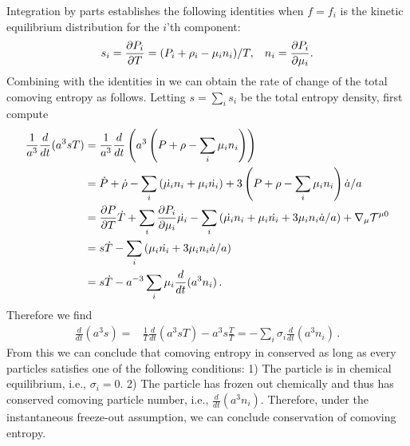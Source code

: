 Integration by parts establishes the following identities when $f=f_i$ is the kinetic equilibrium distribution  for the $i$'th component:
\begin{equation}\label{identities}
s_i=\frac{\partial P_i}{\partial T}=(P_i+\rho_i-\mu_i n_i)/T, \hspace{3mm} n_i=\frac{\partial P_i}{\partial \mu_i}.
\end{equation}
Combining  with the identities in  we can obtain the rate of change of the total comoving entropy as follows.  Letting $s=\sum_i s_i$ be the total entropy density, first compute
\begin{align}\frac{1}{a^3}\frac{d}{dt}(a^3sT)&=\frac{1}{a^{3}}\frac{d}{dt}\left(a^3\left(P+\rho-\sum_i \mu_i n_i\right)\right)\\
&=\dot{P}+\dot{\rho}-\sum_i \left(\dot{\mu_i}n_i+\mu_i\dot{n_i}\right)+3\left(P+\rho-\sum_i \mu_i n_i\right)\dot{a}/a\notag\\
&=\frac{\partial P}{\partial T} \dot{T}+\sum_i\frac{\partial P_i}{\partial \mu_i} \dot{\mu_i}-\sum_i \left(\dot{\mu_i}n_i+\mu_i\dot{n_i}+3\mu_i n_i \dot{a}/a\right)+\nabla_\mu \mathcal{T}^{\mu 0}\notag\\
&=s\dot{T}-\sum_i \left(\mu_i\dot{n_i}+3\mu_i n_i \dot{a}/a\right)\notag\\
&=s\dot{T}- a^{-3}\sum_i\mu_i\frac{d}{dt}(a^3n_i)\,.\notag
\end{align}
Therefore we find
\begin{align}\label{S_n_eq}
\frac{d}{dt}(a^3s)=&\frac{1}{T}\frac{d}{dt}(a^3sT)-a^3s\frac{\dot T}{T}=-\sum_i\sigma_i\frac{d}{dt}(a^3n_i)\,.
\end{align}
From this we can conclude that comoving entropy in conserved as long as every particles satisfies one of the following  conditions: 1) The particle is  in chemical equilibrium, i.e., $\sigma_i= 0$. 2) The particle has frozen out chemically and thus has conserved comoving particle number, i.e., $\frac{d}{dt}(a^3n_i)$.  Therefore, under the instantaneous freeze-out assumption, we can conclude  conservation of comoving entropy. 

